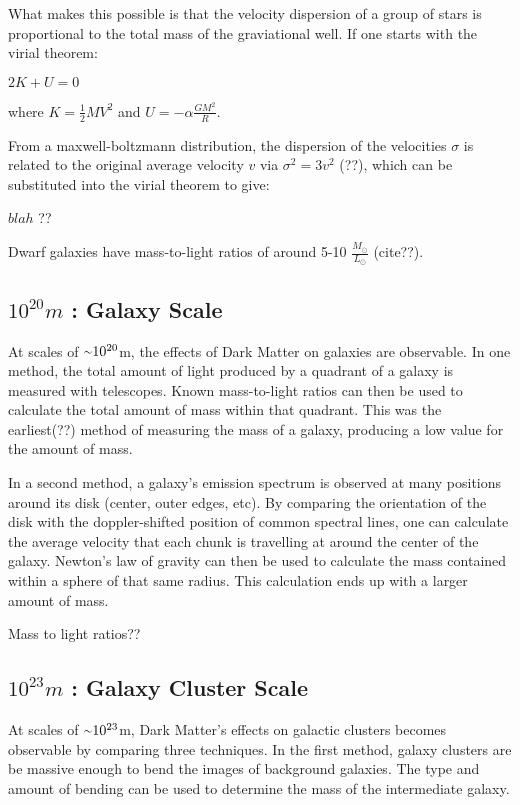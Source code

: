 What makes this possible is that the velocity dispersion of a group of stars is proportional to the total mass of the graviational well.
If one starts with the virial theorem:

$2K + U = 0$

where
$K=\frac{1}{2}MV^{2}$ and $U=-\alpha \frac{GM^2}{R}$.

From a maxwell-boltzmann distribution, the dispersion of the velocities $\sigma$ is related to the original average velocity $v$ via $\sigma^2 = 3v^2$ (??), which can be substituted into the virial theorem to give:

$blah$
??

Dwarf galaxies have mass-to-light ratios of around 5-10 $\frac{M_\odot}{L_\odot}$ (cite??).



\subsection{$10^{20}m$ : Galaxy Scale}
%
At scales of $\nicetilde 10^{20}$m, the effects of Dark Matter on galaxies are observable.
In one method, the total amount of light produced by a quadrant of a galaxy is measured with telescopes.
Known mass-to-light ratios can then be used to calculate the total amount of mass within that quadrant.
This was the earliest(??) method of measuring the mass of a galaxy, producing a low value for the amount of mass.

In a second method, a galaxy's emission spectrum is observed at many positions around its disk (center, outer edges, etc).
By comparing the orientation of the disk with the doppler-shifted position of common spectral lines, one can calculate the average velocity that each chunk is travelling at around the center of the galaxy.
Newton's law of gravity can then be used to calculate the mass contained within a sphere of that same radius.
This calculation ends up with a larger amount of mass.

Mass to light ratios??

\subsection{$10^{23}m$ : Galaxy Cluster Scale}
%
At scales of $\nicetilde 10^{23}$m, Dark Matter's effects on galactic clusters becomes observable by comparing three techniques.
In the first method, galaxy clusters are be massive enough to bend the images of background galaxies.
The type and amount of bending can be used to determine the mass of the intermediate galaxy.

